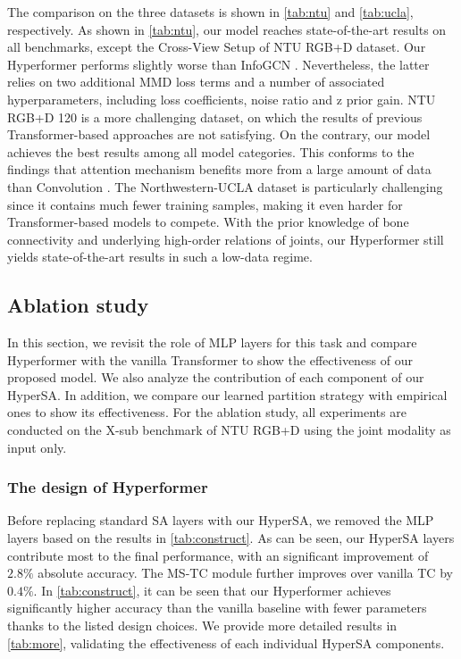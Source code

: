 \documentclass[10pt,twocolumn,letterpaper]{article}
\begin{document}
The comparison on the three datasets is shown in \cref{tab:ntu} and \cref{tab:ucla}, respectively. As shown in \cref{tab:ntu}, our model reaches state-of-the-art results on all benchmarks, except the Cross-View Setup of NTU RGB+D dataset. Our Hyperformer performs slightly worse than InfoGCN \cite{chi2022infogcn}. Nevertheless, the latter relies on two additional MMD loss terms and a number of associated hyperparameters, including loss coefficients, noise ratio and z prior gain. NTU RGB+D 120 is a more challenging dataset, on which the results of previous Transformer-based approaches are not satisfying. On the contrary, our model achieves the best results among all model categories. This conforms to the findings that attention mechanism benefits more from a large amount of data than Convolution \cite{dosovitskiy2021an, touvron2021training}. The Northwestern-UCLA dataset is particularly challenging since it contains much fewer training samples, making it even harder for Transformer-based models to compete. With the prior knowledge of bone connectivity and underlying high-order relations of joints, our Hyperformer still yields state-of-the-art results in such a low-data regime.









\subsection{Ablation study}
In this section, we revisit the role of MLP layers for this task and compare Hyperformer with the vanilla Transformer to show the effectiveness of our proposed model. We also analyze the contribution of each component of our HyperSA. In addition,
we compare our learned partition strategy with empirical ones to show its effectiveness.
For the ablation study, all experiments
are conducted on the
X-sub benchmark of NTU RGB+D using the joint modality as input only.





\subsubsection{The design of Hyperformer}
\label{sec:design}
Before replacing standard SA layers with our HyperSA, we removed the MLP layers based on the results in \cref{tab:construct}. As can be seen, our HyperSA layers contribute most to the final performance, with an significant improvement of $2.8\%$ absolute accuracy. The MS-TC module further improves over vanilla TC by $0.4\%$.
In \cref{tab:construct}, it can be seen that our Hyperformer achieves significantly higher accuracy than the vanilla baseline with fewer parameters thanks to the listed design choices. We provide more detailed results in \cref{tab:more}, validating the effectiveness of each individual HyperSA components. 
\end{document}
